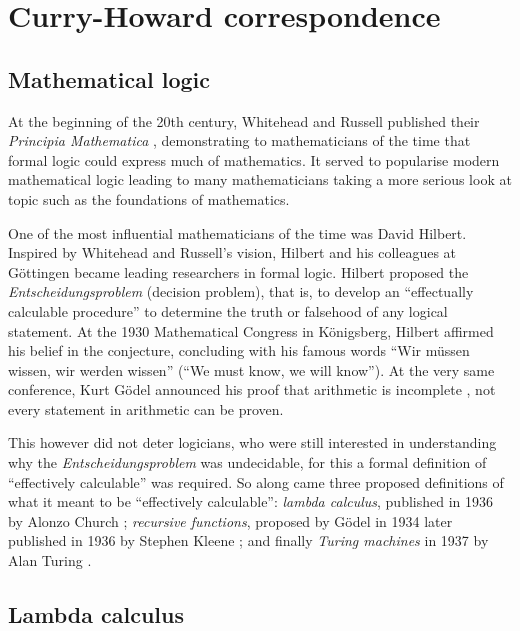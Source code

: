 \section{Curry-Howard correspondence}

\subsection{Mathematical logic}

At the beginning of the 20th century, Whitehead and Russell published their \emph{Principia Mathematica} \cite{GlossarWiki:Whitehead_Russell:1910}, demonstrating to mathematicians of the time that formal logic could express much of mathematics. It served to popularise modern mathematical logic leading to many mathematicians taking a more serious look at topic such as the foundations of mathematics.

One of the most influential mathematicians of the time was David Hilbert. Inspired by Whitehead and Russell's vision, Hilbert and his colleagues at G\"ottingen became leading researchers in formal logic. Hilbert proposed the \emph{Entscheidungsproblem} (decision problem), that is, to develop an ``effectually calculable procedure'' to determine the truth or falsehood of any logical statement. At the 1930 Mathematical Congress in K\"onigsberg, Hilbert affirmed his belief in the conjecture, concluding with his famous words ``Wir m\"ussen wissen, wir werden wissen'' (``We must know, we will know''). At the very same conference, Kurt G\"odel announced his proof that arithmetic is incomplete \cite{GlossarWiki:Goedel:1931}, not every statement in arithmetic can be proven.

This however did not deter logicians, who were still interested in understanding why the \emph{Entscheidungsproblem} was undecidable, for this a formal definition of ``effectively calculable'' was required. So along came three proposed definitions of what it meant to be ``effectively calculable'': \emph{lambda calculus}, published in 1936 by Alonzo Church \cite{church-unsolvableproblemof-1936}; \emph{recursive functions}, proposed by G\"odel in 1934 later published in 1936 by Stephen Kleene \cite{Kleene1936}; and finally \emph{Turing machines} in 1937 by Alan Turing \cite{turing1936a}.

\subsection{Lambda calculus}

